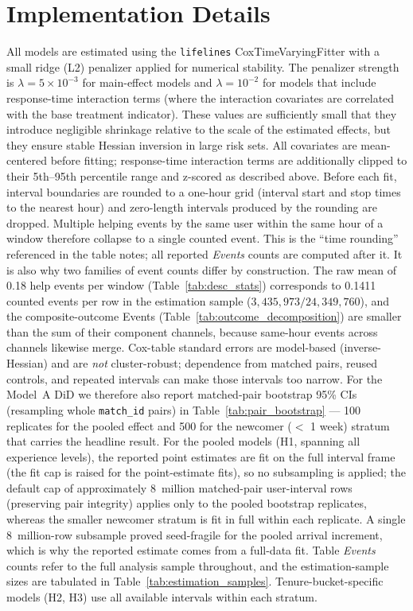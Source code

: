 \section{Implementation Details} All models are estimated using the \texttt{lifelines} CoxTimeVaryingFitter with a small ridge (L2) penalizer applied for numerical stability. The penalizer strength is $\lambda = 5 \times 10^{-3}$ for main-effect models and $\lambda = 10^{-2}$ for models that include response-time interaction terms (where the interaction covariates are correlated with the base treatment indicator). These values are sufficiently small that they introduce negligible shrinkage relative to the scale of the estimated effects, but they ensure stable Hessian inversion in large risk sets. All covariates are mean-centered before fitting; response-time interaction terms are additionally clipped to their 5th--95th percentile range and z-scored as described above. Before each fit, interval boundaries are rounded to a one-hour grid (interval start and stop times to the nearest hour) and zero-length intervals produced by the rounding are dropped. Multiple helping events by the same user within the same hour of a window therefore collapse to a single counted event. This is the ``time rounding'' referenced in the table notes; all reported \textit{Events} counts are computed after it. It is also why two families of event counts differ by construction. The raw mean of 0.18 help events per window (Table~\ref{tab:desc_stats}) corresponds to 0.1411 counted events per row in the estimation sample ($3{,}435{,}973/24{,}349{,}760$), and the composite-outcome Events (Table~\ref{tab:outcome_decomposition}) are smaller than the sum of their component channels, because same-hour events across channels likewise merge. Cox-table standard errors are model-based (inverse-Hessian) and are \emph{not} cluster-robust; dependence from matched pairs, reused controls, and repeated intervals can make those intervals too narrow. For the Model~A DiD we therefore also report matched-pair bootstrap 95\% CIs (resampling whole \texttt{match\_id} pairs) in Table~\ref{tab:pair_bootstrap} --- 100 replicates for the pooled effect and 500 for the newcomer ($<$ 1 week) stratum that carries the headline result. For the pooled models (H1, spanning all experience levels), the reported point estimates are fit on the full interval frame (the fit cap is raised for the point-estimate fits), so no subsampling is applied; the default cap of approximately 8~million matched-pair user-interval rows (preserving pair integrity) applies only to the pooled bootstrap replicates, whereas the smaller newcomer stratum is fit in full within each replicate. A single 8~million-row subsample proved seed-fragile for the pooled arrival increment, which is why the reported estimate comes from a full-data fit. Table \textit{Events} counts refer to the full analysis sample throughout, and the estimation-sample sizes are tabulated in Table~\ref{tab:estimation_samples}. Tenure-bucket-specific models (H2, H3) use all available intervals within each stratum.
